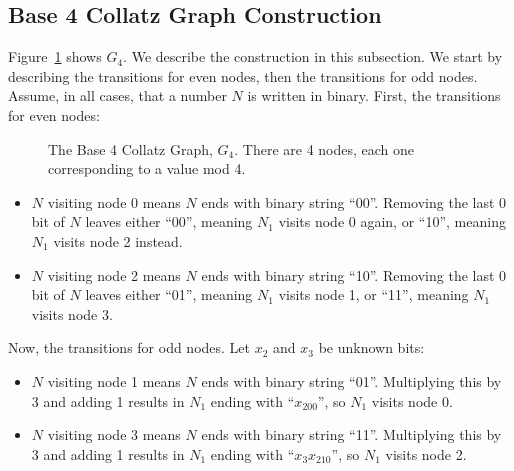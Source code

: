  \subsection{Base 4 Collatz Graph Construction} \label{subsubsec:proofbase4graph}
Figure~\ref{fig:base_4_graph} shows $G_4$. We describe the construction in this subsection. We start by describing the transitions for even nodes, then the transitions for odd nodes. Assume, in all cases, that a number $N$ is written in binary. First, the transitions for even nodes:
\begin{figure}
    \centering
    \caption{The Base 4 Collatz Graph, $G_4$. There are 4 nodes, each one corresponding to a value mod 4.}
    \label{fig:base_4_graph}
\end{figure}

\begin{itemize}
    \item $N$ visiting node 0 means $N$ ends with binary string ``00''. Removing the last 0 bit of $N$ leaves either ``00'', meaning $N_1$ visits node 0 again, or ``10'', meaning $N_1$ visits node 2 instead.
    \item $N$ visiting node 2 means $N$ ends with binary string ``10''. Removing the last 0 bit of $N$ leaves either ``01'', meaning $N_1$ visits node 1, or ``11'', meaning $N_1$ visits node 3.
\end{itemize}
Now, the transitions for odd nodes. Let $x_2$ and $x_3$ be unknown bits:
\begin{itemize}
    \item $N$ visiting node 1 means $N$ ends with binary string ``01''.  Multiplying this by 3 and adding 1 results in $N_1$ ending with ``$x_200$'', so $N_1$ visits node 0.
    \item $N$ visiting node 3 means $N$ ends with binary string ``11''.  Multiplying this by 3 and adding 1 results in $N_1$ ending with ``$x_3x_210$'', so $N_1$ visits node 2.
\end{itemize}
